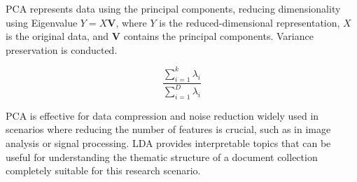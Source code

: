 \documentclass[sn-mathphys,Numbered]{sn-jnl}%
\theoremstyle{thmstyleone}%
\theoremstyle{thmstyletwo}%
\theoremstyle{thmstylethree}%
\begin{document}



PCA represents data using the principal components, reducing dimensionality using Eigenvalue \(Y = X \bm{V}\), where \(Y\) is the reduced-dimensional representation, \(X\) is the original data, and \(\bm{V}\) contains the principal components. Variance preservation is conducted.

\begin{equation}
    \frac{\sum_{i=1}^{k}\lambda_i}{\sum_{i=1}^{D}\lambda_i}
\end{equation}

PCA is effective for data compression and noise reduction widely used in scenarios where reducing the number of features is crucial, such as in image analysis or signal processing. LDA provides interpretable topics that can be useful for understanding the thematic structure of a document collection completely suitable for this research scenario.\\
\end{document}
